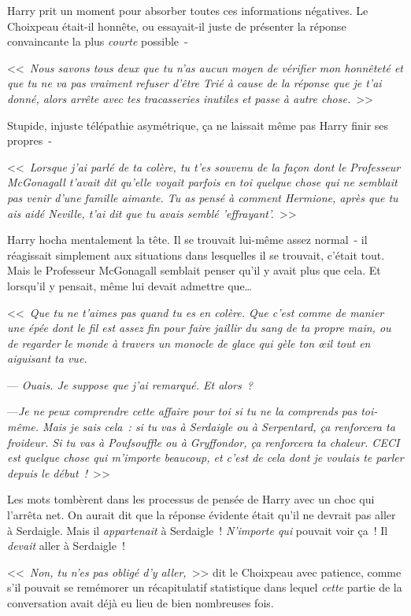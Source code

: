 Harry prit un moment pour absorber toutes ces informations négatives. Le Choixpeau était-il honnête, ou essayait-il juste de présenter la réponse convaincante la plus \emph{courte} possible~-

<<~\emph{Nous savons tous deux que tu n'as aucun moyen de vérifier mon honnêteté et que tu ne va pas vraiment refuser d'être Trié à cause de la réponse que je t'ai donné, alors arrête avec tes tracasseries inutiles et passe à autre chose.}~>>

Stupide, injuste télépathie asymétrique, ça ne laissait même pas Harry finir ses propres~-

<<~\emph{Lorsque j'ai parlé de ta colère, tu t'es souvenu de la façon dont le Professeur McGonagall t'avait dit qu'elle voyait parfois en toi quelque chose qui ne semblait pas venir d'une famille aimante. Tu as pensé à comment Hermione, après que tu ais aidé Neville, t'ai dit que tu avais semblé 'effrayant'.}~>>

Harry hocha mentalement la tête. Il se trouvait lui-même assez normal~- il réagissait simplement aux situations dans lesquelles il se trouvait, c'était tout. Mais le Professeur McGonagall semblait penser qu'il y avait plus que cela. Et lorsqu'il y pensait, même lui devait admettre que…

<<~\emph{Que tu ne t'aimes pas quand tu es en colère. Que c'est comme de manier une épée dont le fil est assez fin pour faire jaillir du sang de ta propre main, ou de regarder le monde à travers un monocle de glace qui gèle ton œil tout en aiguisant ta vue.}

--- \emph{Ouais. Je suppose que j'ai remarqué. Et alors~?}

---\emph{Je ne peux comprendre cette affaire pour toi si tu ne la comprends pas toi-même. Mais je sais cela~: si tu vas à Serdaigle ou à Serpentard, ça renforcera ta froideur. Si tu vas à Poufsouffle ou à Gryffondor, ça renforcera ta chaleur. CECI est quelque chose qui m'importe beaucoup, et c'est de cela dont je voulais te parler depuis le début~!}~>>

Les mots tombèrent dans les processus de pensée de Harry avec un choc qui l'arrêta net. On aurait dit que la réponse évidente était qu'il ne devrait pas aller à Serdaigle. Mais il \emph{appartenait} à Serdaigle~! \emph{N'importe qui} pouvait voir ça~! Il \emph{devait} aller à Serdaigle~!

<<~\emph{Non, tu n'es pas obligé d'y aller,}~>> dit le Choixpeau avec patience, comme s'il pouvait se remémorer un récapitulatif statistique dans lequel \emph{cette} partie de la conversation avait déjà eu lieu de bien nombreuses fois.

